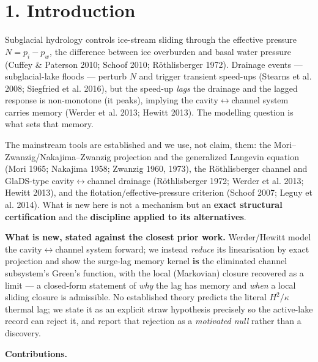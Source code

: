 \documentclass[11pt]{article}
\begin{document}
\begin{abstract}
and the diagnosis of the matched-lag null — not a verified surge-lag value.


\end{abstract}


\section*{1. Introduction}


Subglacial hydrology controls ice-stream sliding through the effective pressure $N=p_{i}-p_{w}$, the difference between ice overburden and basal water pressure (Cuffey \& Paterson 2010; Schoof 2010; Röthlisberger 1972). Drainage events — subglacial-lake floods — perturb $N$ and trigger transient speed-ups (Stearns et al. 2008; Siegfried et al. 2016), but the speed-up \emph{lags} the drainage and the lagged response is non-monotone (it peaks), implying the cavity\ensuremath{\leftrightarrow}channel system carries memory (Werder et al. 2013; Hewitt 2013). The modelling question is what sets that memory.


The mainstream tools are established and we use, not claim, them: the Mori–Zwanzig/Nakajima–Zwanzig projection and the generalized Langevin equation (Mori 1965; Nakajima 1958; Zwanzig 1960, 1973), the Röthlisberger channel and GlaDS-type cavity\ensuremath{\leftrightarrow}channel drainage (Röthlisberger 1972; Werder et al. 2013; Hewitt 2013), and the flotation/effective-pressure criterion (Schoof 2007; Leguy et al. 2014). What is new here is not a mechanism but an \textbf{exact structural certification} and the \textbf{discipline applied to its alternatives}.


\textbf{What is new, stated against the closest prior work.} Werder/Hewitt model the cavity\ensuremath{\leftrightarrow}channel system forward; we instead \emph{reduce} its linearisation by exact projection and show the surge-lag memory kernel \textbf{is} the eliminated channel subsystem's Green's function, with the local (Markovian) closure recovered as a limit — a closed-form statement of \emph{why} the lag has memory and \emph{when} a local sliding closure is admissible. No established theory predicts the literal $H^{2}/\kappa $ thermal lag; we state it as an explicit straw hypothesis precisely so the active-lake record can reject it, and report that rejection as a \emph{motivated null} rather than a discovery.


\textbf{Contributions.}
\end{document}
